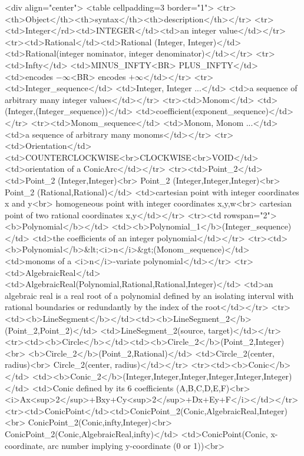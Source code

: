 \begin{ccHtmlOnly}
<div align="center">
<table cellpadding=3 border="1">
<tr><th>Object</th><th>syntax</th><th>description</th></tr>
<tr><td>Integer</rd><td>INTEGER</td><td>an integer value</td></tr>
<tr><td>Rational</td><td>Rational (Integer, Integer)</td>
  <td>Rational(integer nominator, integer denominator)</td></tr>
<tr><td>Infty</td>
    <td>MINUS_INFTY<BR>
        PLUS_INFTY</td>
    <td>encodes $-\infty$<BR>
        encodes $+\infty$</td></tr>
<tr><td>Integer_sequence</td>
    <td>Integer, Integer ...</td>
    <td>a sequence of arbitrary many integer values</td></tr>
<tr><td>Monom</td>
    <td>(Integer,(Integer_sequence))</td>
    <td>coefficient(exponent_sequence)</td></tr>
<tr><td>Monom_sequence</td>
    <td>Monom, Monom ...</td>
    <td>a sequence of arbitrary many monoms</td></tr>
<tr><td>Orientation</td><td>COUNTERCLOCKWISE<br>CLOCKWISE<br>VOID</td><td>orientation of a ConicArc</td></tr>
<tr><td>Point_2</td>
  <td>Point_2 (Integer,Integer)<br>
      Point_2 (Integer,Integer,Integer)<br>
      Point_2 (Rational,Rational)</td>
  <td>cartesian point with integer coordinates x and y<br>
      homogeneous point with integer coordinates x,y,w<br>
      cartesian point of two rational coordinates x,y</td></tr>
<tr><td rowspan="2"><b>Polynomial</b></td>
    <td><b>Polynomial_1</b>(Integer_sequence)</td>
    <td>the coefficients of an integer polynomial</td></tr>
<tr><td><b>Polynomial</b>&lt;<i>n</i>&gt;(Monom_sequence)</td>
    <td>monoms of a <i>n</i>-variate polynomial</td></tr>
<tr><td>AlgebraicReal</td>
    <td>AlgebraicReal(Polynomial,Rational,Rational,Integer)</td>
    <td>an algebraic real is a real root of a polynomial defined by an
        isolating interval with rational boundaries or redundantly by
	the index of the root</td></tr>
<tr><td><b>LineSegment</b></td><td><b>LineSegment_2</b>(Point_2,Point_2)</td>
  <td>LineSegment_2(source, target)</td></tr>
<tr><td><b>Circle</b></td><td><b>Circle_2</b>(Point_2,Integer)<br>
                              <b>Circle_2</b>(Point_2,Rational)</td>
  <td>Circle_2(center, radius)<br>
      Circle_2(center, radius)</td></tr>
<tr><td><b>Conic</b></td>
  <td><b>Conic_2</b>(Integer,Integer,Integer,Integer,Integer,Integer)</td>
  <td>Conic defined by its 6 coefficients (A,B,C,D,E,F)<br>
      <i>Ax<sup>2</sup>+Bxy+Cy<sup>2</sup>+Dx+Ey+F</i></td></tr>
<tr><td>ConicPoint</td><td>ConicPoint_2(Conic,AlgebraicReal,Integer)<br>
                           ConicPoint_2(Conic,infty,Integer)<br>
			   ConicPoint_2(Conic,AlgebraicReal,infty)</td>
                       <td>ConicPoint(Conic, x-coordinate, arc number implying y-coordinate (0 or 1))<br>

\end{ccHtmlOnly}
